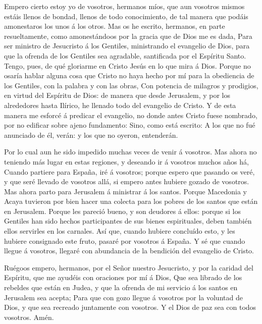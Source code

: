  Empero cierto estoy yo de vosotros, hermanos míos, que aun
vosotros mismos estáis llenos de bondad, llenos de todo conocimiento, de
tal manera que podáis amonestaros los unos á los otros. 
Mas os he escrito, hermanos, en parte resueltamente, como amonestándoos
por la gracia que de Dios me es dada,  Para ser ministro de
Jesucristo á los Gentiles, ministrando el evangelio de Dios, para que la
ofrenda de los Gentiles sea agradable, santificada por el Espíritu
Santo.  Tengo, pues, de qué gloriarme en Cristo Jesús en lo
que mira á Dios.  Porque no osaría hablar alguna cosa que
Cristo no haya hecho por mí para la obediencia de los Gentiles, con la
palabra y con las obras,  Con potencia de milagros y
prodigios, en virtud del Espíritu de Dios: de manera que desde
Jerusalem, y por los alrededores hasta Ilírico, he llenado todo del
evangelio de Cristo.  Y de esta manera me esforcé á
predicar el evangelio, no donde antes Cristo fuese nombrado, por no
edificar sobre ajeno fundamento:  Sino, como está escrito:
A los que no fué anunciado de él, verán: y los que no oyeron,
entenderán.

 Por lo cual aun he sido impedido muchas veces de venir á
vosotros.  Mas ahora no teniendo más lugar en estas
regiones, y deseando ir á vosotros muchos años há,  Cuando
partiere para España, iré á vosotros; porque espero que pasando os veré,
y que seré llevado de vosotros allá, si empero antes hubiere gozado de
vosotros.  Mas ahora parto para Jerusalem á ministrar á los
santos.  Porque Macedonia y Acaya tuvieron por bien hacer
una colecta para los pobres de los santos que están en Jerusalem.
 Porque les pareció bueno, y son deudores á ellos: porque
si los Gentiles han sido hechos participantes de sus bienes
espirituales, deben también ellos servirles en los carnales.
 Así que, cuando hubiere concluído esto, y les hubiere
consignado este fruto, pasaré por vosotros á España.  Y sé
que cuando llegue á vosotros, llegaré con abundancia de la bendición del
evangelio de Cristo.

 Ruégoos empero, hermanos, por el Señor nuestro Jesucristo,
y por la caridad del Espíritu, que me ayudéis con oraciones por mí á
Dios,  Que sea librado de los rebeldes que están en Judea,
y que la ofrenda de mi servicio á los santos en Jerusalem sea acepta;
 Para que con gozo llegue á vosotros por la voluntad de
Dios, y que sea recreado juntamente con vosotros.  Y el
Dios de paz sea con todos vosotros. Amén.

